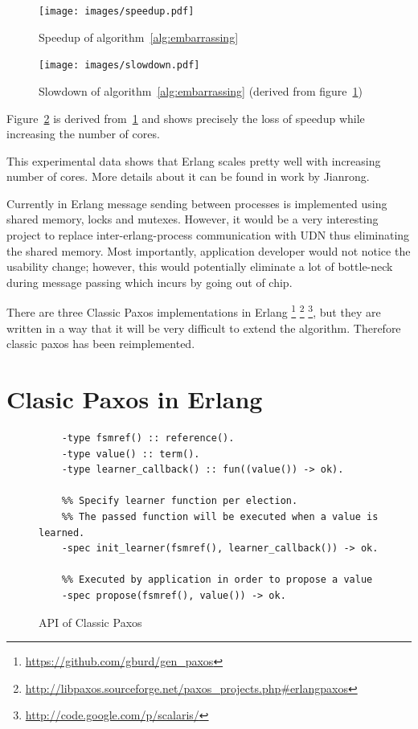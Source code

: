 \documentclass[english,11pt]{l4proj}
\begin{document}
\begin{figure}
    \centering
    \texttt{[image: images/speedup.pdf]}
    \caption{Speedup of algorithm~\ref{alg:embarrassing}}
    \label{fig:parallel_speedup}
\end{figure}

\begin{figure}
    \centering
    \texttt{[image: images/slowdown.pdf]}
    \caption{Slowdown of algorithm~\ref{alg:embarrassing} (derived
    from figure~\ref{fig:parallel_speedup})}
    \label{fig:parallel_slowdown}
\end{figure}

Figure~\ref{fig:parallel_slowdown} is derived from~\ref{fig:parallel_speedup}
and shows precisely the loss of speedup while increasing the number of cores.

This experimental data shows that Erlang scales pretty well with increasing
number of cores. More details about it can be found in work by
Jianrong\cite{erlang-manycore-scalability}.

Currently in Erlang message sending between processes is implemented using
shared memory, locks and mutexes. However, it would be a very interesting
project to replace inter-erlang-process communication with UDN thus eliminating
the shared memory. Most importantly, application developer would not notice the
usability change; however, this would potentially eliminate a lot of bottle-neck
during message passing which incurs by going out of chip.

\label{sec:paxos-api}

There are three Classic Paxos implementations in Erlang
\footnote{\url{https://github.com/gburd/gen\_paxos}}
\footnote{\url{http://libpaxos.sourceforge.net/paxos\_projects.php\#erlangpaxos}}
\footnote{\url{http://code.google.com/p/scalaris/}}, but they are written in a
way that it will be very difficult to extend the algorithm. Therefore classic
paxos has been reimplemented.

\section{Clasic Paxos in Erlang}

\begin{figure}
    \begin{verbatim}
    -type fsmref() :: reference().
    -type value() :: term().
    -type learner_callback() :: fun((value()) -> ok).

    %% Specify learner function per election.
    %% The passed function will be executed when a value is learned.
    -spec init_learner(fsmref(), learner_callback()) -> ok.

    %% Executed by application in order to propose a value
    -spec propose(fsmref(), value()) -> ok.
    \end{verbatim}
    \caption{API of Classic Paxos\cite{epaxos}}
    \label{fig:paxos-api}
\end{figure}
\end{document}
